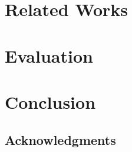 \documentclass{article} %
\begin{document}
\section{Related Works}



\section{Evaluation}



\section{Conclusion}



\subsection*{Acknowledgments}





\end{document}
